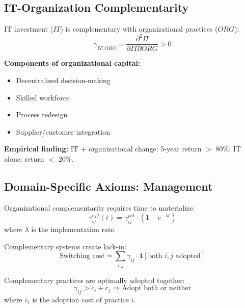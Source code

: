 \subsection{IT-Organization Complementarity}

\begin{tcolorbox}[colback=green!5!white,colframe=green!75!black,title=\textbf{Brynjolfsson \& Hitt (2000): IT and Organizational Capital}]
IT investment ($IT$) is complementary with organizational practices ($ORG$):
\begin{equation}
\gamma_{IT,ORG} = \frac{\partial^2 \Pi}{\partial IT \partial ORG} > 0
\end{equation}

\textbf{Components of organizational capital:}
\begin{itemize}[noitemsep]
    \item Decentralized decision-making
    \item Skilled workforce
    \item Process redesign
    \item Supplier/customer integration
\end{itemize}

\textbf{Empirical finding:} IT + organizational change: 5-year return $>$ 80\%; IT alone: return $<$ 20\%.
\end{tcolorbox}

\subsection{Domain-Specific Axioms: Management}

\begin{axiom}
Organizational complementarity requires time to materialize:
\begin{equation}
\gamma^{eff}_{ij}(t) = \gamma^{pot}_{ij} \cdot (1 - e^{-\lambda t})
\end{equation}
where $\lambda$ is the implementation rate.
\end{axiom}

\begin{axiom}
Complementary systems create lock-in:
\begin{equation}
\text{Switching cost} = \sum_{i,j} \gamma_{ij} \cdot \mathbf{1}[\text{both } i,j \text{ adopted}]
\end{equation}
\end{axiom}

\begin{axiom}
Complementary practices are optimally adopted together:
\begin{equation}
\gamma_{ij} > c_i + c_j \Rightarrow \text{Adopt both or neither}
\end{equation}
where $c_i$ is the adoption cost of practice $i$.
\end{axiom}

